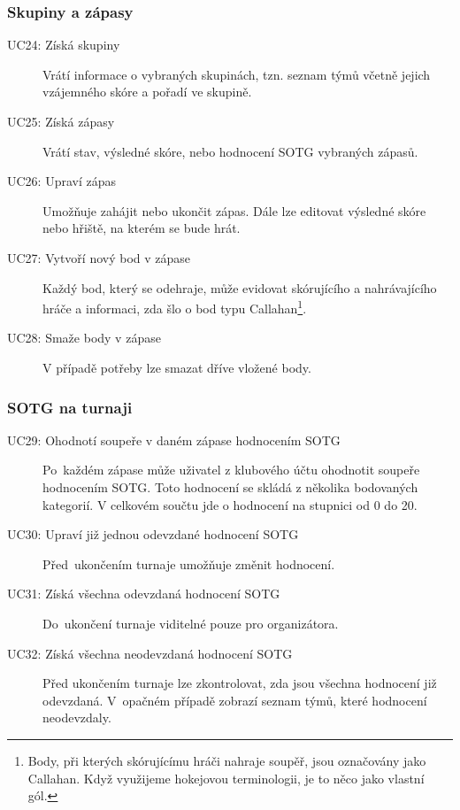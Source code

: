 \subsubsection*{Skupiny a zápasy}
  \begin{description}
    \item[UC24: Získá skupiny]
      Vrátí informace o vybraných skupinách, tzn. seznam týmů včetně jejich vzájemného skóre a pořadí ve skupině.
    \item[UC25: Získá zápasy]
      Vrátí stav, výsledné skóre, nebo hodnocení SOTG vybraných zápasů.
    \item[UC26: Upraví zápas]
      Umožňuje zahájit nebo ukončit zápas. Dále lze editovat výsledné skóre nebo hřiště, na kterém se bude hrát.
    \item[UC27: Vytvoří nový bod v zápase]
      Každý bod, který se odehraje, může evidovat skórujícího a nahrávajícího hráče a informaci, zda šlo o bod typu Callahan\footnote{
      Body, při kterých skórujícímu hráči nahraje soupěř, jsou označovány jako Callahan.
      Když využijeme hokejovou terminologii, je to něco jako vlastní gól.}.
    \item[UC28: Smaže body v zápase]
      V případě potřeby lze smazat dříve vložené body.
  \end{description}

\subsubsection*{SOTG na turnaji}
  \begin{description}
    \item[UC29: Ohodnotí soupeře v daném zápase hodnocením SOTG]
      Po~každém zápase může uživatel z klubového účtu ohodnotit soupeře hodnocením SOTG.
      Toto hodnocení se skládá z několika bodovaných kategorií.
      V celkovém součtu jde o hodnocení na stupnici od 0 do 20.
    \item[UC30: Upraví již jednou odevzdané hodnocení SOTG]
      Před~ukončením turnaje umožňuje změnit hodnocení.
    \item[UC31: Získá všechna odevzdaná hodnocení SOTG]
      Do~ukončení turnaje viditelné pouze pro organizátora.
    \item[UC32: Získá všechna neodevzdaná hodnocení SOTG]
      Před ukončením turnaje lze zkontrolovat, zda jsou všechna hodnocení již odevzdaná.
      V~opačném případě zobrazí seznam týmů, které hodnocení neodevzdaly.
  \end{description}

